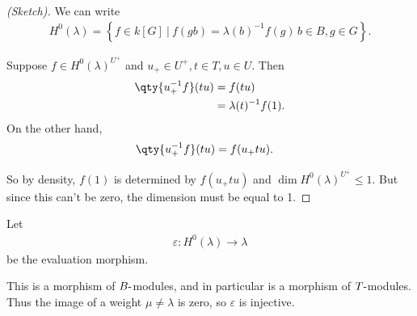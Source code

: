 \begin{proof}[(Sketch)]

We can write
\begin{align*}  
H^0(\lambda) = \left\{{f\in k[G] {~\mathrel{\Big|}~}f(gb) = \lambda(b)^{-1} f(g) \, b\in B, g\in G}\right\}
.\end{align*}

Suppose \(f\in H^0(\lambda)^{U^+}\) and \(u_+ \in U^+, t\in T, u\in U\).
Then
\begin{align*}  
\qty{ u_+^{-1} f} (tu) 
&= f(tu) \\
&= \lambda(t)^{-1} f(1)
.\end{align*}
On the other hand,
\begin{align*}  
\qty{ u_+^{-1} f} (tu) 
&= f(u_+ t u)
.\end{align*}

So by density, \(f(1)\) is determined by \(f(u_+ t u)\) and
\(\dim H^0(\lambda)^{U^+} \leq 1\). But since this can't be zero, the
dimension must be equal to 1.

\end{proof}

\begin{proposition}[?]

Let
\begin{align*}  
\varepsilon: H^0(\lambda) \to \lambda
\end{align*}
be the evaluation morphism.

This is a morphism of \(B{\hbox{-}}\)modules, and in particular is a
morphism of \(T{\hbox{-}}\)modules. Thus the image of a weight
\(\mu \neq \lambda\) is zero, so \(\varepsilon\) is injective.

\end{proposition}

